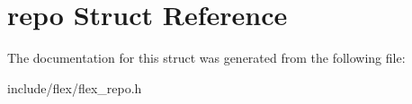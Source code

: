 \hypertarget{structrepo}{}\section{repo Struct Reference}
\label{structrepo}


The documentation for this struct was generated from the following file\+:\begin{DoxyCompactItemize}
\item 
include/flex/flex\+\_\+repo.\+h\end{DoxyCompactItemize}
